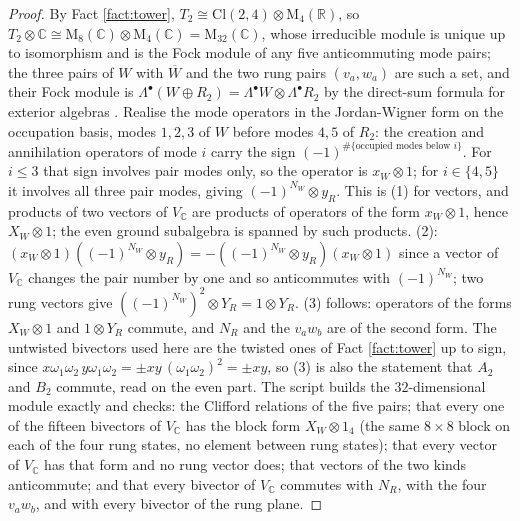 \documentclass[11pt]{article}
\theoremstyle{definition}
\newcommand{\Cl}{\mathrm{Cl}}
\newcommand{\R}{\mathbb{R}}
\newcommand{\C}{\mathbb{C}}
\begin{document}
\begin{proof}
By Fact \ref{fact:tower}, $T_{2} \cong \Cl(2,4) \otimes \mathrm{M}_{4}(\R)$, so $T_{2} \otimes \C \cong \mathrm{M}_{8}(\C) \otimes \mathrm{M}_{4}(\C) = \mathrm{M}_{32}(\C)$, whose irreducible module is unique up to isomorphism and is the Fock module of any five anticommuting mode pairs; the three pairs of $W$ with $\overline{W}$ and the two rung pairs $(v_{a}, w_{a})$ are such a set, and their Fock module is $\Lambda^{\bullet}(W \oplus R_{2}) = \Lambda^{\bullet}W \otimes \Lambda^{\bullet}R_{2}$ by the direct-sum formula for exterior algebras \cite[App.~B.2]{FultonHarris1991}. Realise the mode operators in the Jordan-Wigner form on the occupation basis, modes $1, 2, 3$ of $W$ before modes $4, 5$ of $R_{2}$: the creation and annihilation operators of mode $i$ carry the sign $(-1)^{\#\{\text{occupied modes below } i\}}$. For $i \le 3$ that sign involves pair modes only, so the operator is $x_{W} \otimes 1$; for $i \in \{4, 5\}$ it involves all three pair modes, giving $(-1)^{N_{W}} \otimes y_{R}$. This is (1) for vectors, and products of two vectors of $V_{\C}$ are products of operators of the form $x_{W} \otimes 1$, hence $X_{W} \otimes 1$; the even ground subalgebra is spanned by such products. (2): $(x_{W} \otimes 1)((-1)^{N_{W}} \otimes y_{R}) = -((-1)^{N_{W}} \otimes y_{R})(x_{W} \otimes 1)$ since a vector of $V_{\C}$ changes the pair number by one and so anticommutes with $(-1)^{N_{W}}$; two rung vectors give $((-1)^{N_{W}})^{2} \otimes Y_{R} = 1 \otimes Y_{R}$. (3) follows: operators of the forms $X_{W} \otimes 1$ and $1 \otimes Y_{R}$ commute, and $N_{R}$ and the $v_{a}w_{b}$ are of the second form. The untwisted bivectors used here are the twisted ones of Fact \ref{fact:tower} up to sign, since $x\omega_{1}\omega_{2}\,y\omega_{1}\omega_{2} = \pm xy\,(\omega_{1}\omega_{2})^{2} = \pm xy$, so (3) is also the statement that $A_{2}$ and $B_{2}$ commute, read on the even part. The script builds the $32$-dimensional module exactly and checks: the Clifford relations of the five pairs; that every one of the fifteen bivectors of $V_{\C}$ has the block form $X_{W} \otimes 1_{4}$ (the same $8 \times 8$ block on each of the four rung states, no element between rung states); that every vector of $V_{\C}$ has that form and no rung vector does; that vectors of the two kinds anticommute; and that every bivector of $V_{\C}$ commutes with $N_{R}$, with the four $v_{a}w_{b}$, and with every bivector of the rung plane.
\end{proof}
\end{document}
